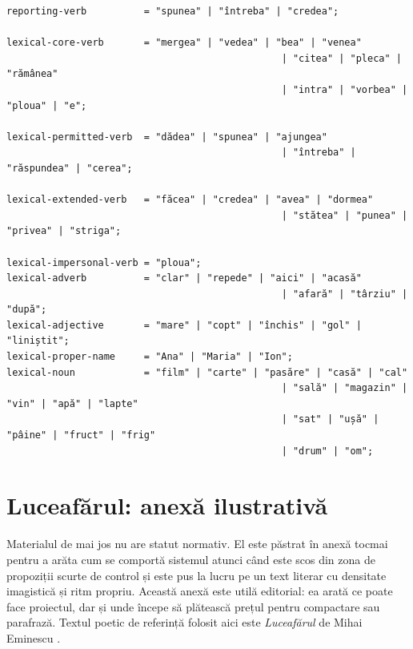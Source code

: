 \documentclass[12pt,onecolumn,letterpaper]{article}
\begin{document}
\begin{verbatim}
reporting-verb          = "spunea" | "întreba" | "credea";

lexical-core-verb       = "mergea" | "vedea" | "bea" | "venea"
                                                | "citea" | "pleca" | "rămânea"
                                                | "intra" | "vorbea" | "ploua" | "e";

lexical-permitted-verb  = "dădea" | "spunea" | "ajungea"
                                                | "întreba" | "răspundea" | "cerea";

lexical-extended-verb   = "făcea" | "credea" | "avea" | "dormea"
                                                | "stătea" | "punea" | "privea" | "striga";

lexical-impersonal-verb = "ploua";
lexical-adverb          = "clar" | "repede" | "aici" | "acasă"
                                                | "afară" | "târziu" | "după";
lexical-adjective       = "mare" | "copt" | "închis" | "gol" | "liniștit";
lexical-proper-name     = "Ana" | "Maria" | "Ion";
lexical-noun            = "film" | "carte" | "pasăre" | "casă" | "cal"
                                                | "sală" | "magazin" | "vin" | "apă" | "lapte"
                                                | "sat" | "ușă" | "pâine" | "fruct" | "frig"
                                                | "drum" | "om";
\end{verbatim}
\normalsize

\section{Luceafărul: anexă ilustrativă}

Materialul de mai jos nu are statut normativ. El este păstrat în anexă tocmai
pentru a arăta cum se comportă sistemul atunci când este scos din zona de propoziții
scurte de control și este pus la lucru pe un text literar cu densitate imagistică și
ritm propriu. Această anexă este utilă editorial: ea arată ce poate face proiectul,
dar și unde începe să plătească prețul pentru compactare sau parafrază. Textul
poetic de referință folosit aici este \textit{Luceafărul} de Mihai Eminescu
\cite{eminescu-luceafarul}.

\small
\end{document}
